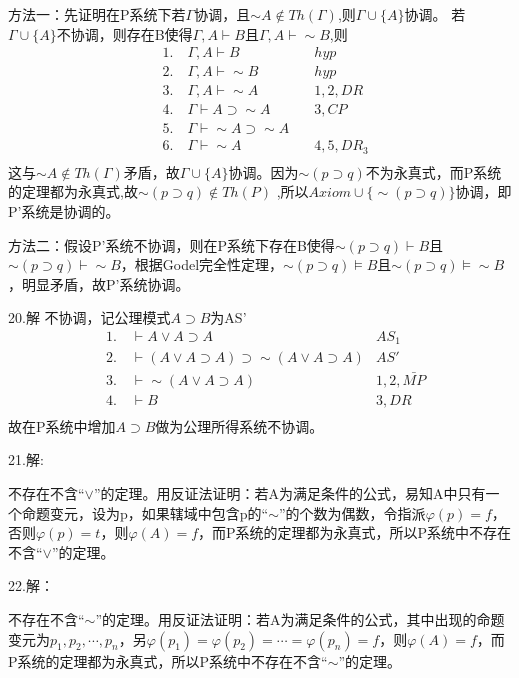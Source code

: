 \documentclass[a4paper]{ctexart}
\begin{document}
方法一：先证明在P系统下若$\Gamma$协调，且$\sim A\not\in Th(\Gamma)$,则$\Gamma\cup \{A\}$协调。
若$\Gamma\cup \{A\}$不协调，则存在B使得$\Gamma,A\vdash B$且$\Gamma,A\vdash \sim B$,则
\begin{align*}
  &1.\quad \Gamma,A\vdash B \quad & hyp \\
  &2.\quad \Gamma,A\vdash \sim B \quad & hyp \\
  &3.\quad \Gamma,A\vdash \sim A \quad & 1,2,DR\\
  &4.\quad \Gamma\vdash A\supset \sim A \quad&  3,CP\\
  &5.\quad \Gamma\vdash \sim A\supset \sim A  \quad & \\
  &6.\quad \Gamma\vdash \sim A \quad & 4,5,DR_3\\
\end{align*}这与$\sim A\not\in Th(\Gamma)$矛盾，故$\Gamma\cup \{A\}$协调。因为$\sim(p\supset q)$不为永真式，而P系统的定理都为永真式,故$\sim(p\supset q)\not\in Th(P)$ ,所以$Axiom\cup\{\sim(p\supset q)\}$协调，即P'系统是协调的。

方法二：假设P'系统不协调，则在P系统下存在B使得$\sim(p\supset q)\vdash B$且$\sim(p\supset q)\vdash \sim B$，根据Godel完全性定理，$\sim(p\supset q)\models B$且$\sim(p\supset q)\models \sim B$，明显矛盾，故P'系统协调。\newline

\noindent 20.解
不协调，记公理模式$A\supset B$为AS'
\begin{align*}
  &1.\quad \vdash A\vee A\supset A &AS_{1} \\
  &2.\quad \vdash (A\vee A\supset A)\supset \sim(A\vee A\supset A)&AS' \\
  &3.\quad \vdash \sim(A\vee A\supset A) &1,2,\bar{MP} \\
  &4.\quad \vdash B &3,DR \\
\end{align*}
故在P系统中增加$A\supset B$做为公理所得系统不协调。\newline

\noindent 21.解:

不存在不含“$\vee$”的定理。用反证法证明：若A为满足条件的公式，易知A中只有一个命题变元，设为p，如果辖域中包含p的“$\sim$”的个数为偶数，令指派$\varphi(p)=f$，否则$\varphi(p)=t$，则$\varphi(A)=f$，而P系统的定理都为永真式，所以P系统中不存在不含“$\vee$”的定理。\newline

\noindent 22.解：

不存在不含“$\sim$”的定理。用反证法证明：若A为满足条件的公式，其中出现的命题变元为$p_1,p_2,\cdots,p_n$，另$\varphi(p_1)=\varphi(p_2)=\cdots=\varphi(p_n)=f$，则$\varphi(A)=f$，而P系统的定理都为永真式，所以P系统中不存在不含“$\sim$”的定理。\newline
\end{document}
